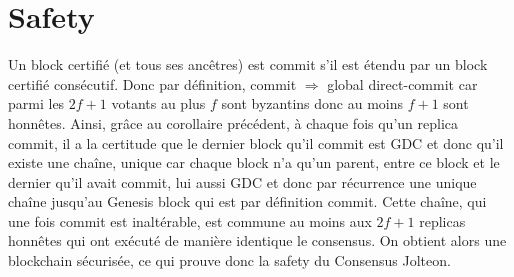 \documentclass{article}
\begin{document}
\section*{Safety}
Un block certifié (et tous ses ancêtres) est commit s'il est étendu par un block certifié consécutif. Donc par définition, commit \(\Rightarrow\) global direct-commit car parmi les \(2f+1\) votants au plus \(f\) sont byzantins donc au moins \(f+1\) sont honnêtes. Ainsi, grâce au corollaire précédent, à chaque fois qu'un replica commit, il a la certitude que le dernier block qu'il commit est GDC et donc qu'il existe une chaîne, unique car chaque block n'a qu'un parent, entre ce block et le dernier qu'il avait commit, lui aussi GDC et donc par récurrence une unique chaîne jusqu'au Genesis block qui est par définition commit. Cette chaîne, qui une fois commit est inaltérable, est commune au moins aux \(2f+1\) replicas honnêtes qui ont exécuté de manière identique le consensus. On obtient alors une blockchain sécurisée, ce qui prouve donc la safety du Consensus Jolteon.
\end{document}
